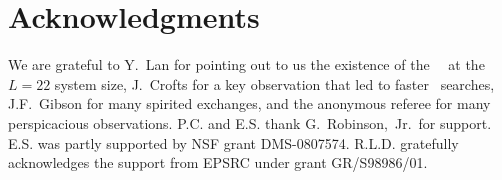 
\section*{Acknowledgments}

We are grateful to Y.~Lan for pointing out to us the existence of
the  ~\eqv\ at the $L=22$ system size, J.~Crofts for a key
observation  that led to faster \rpo\ searches,
J.F.~Gibson for many spirited exchanges, and the anonymous referee
for many perspicacious observations.
P.C. and E.S. thank
G.~Robinson,~Jr.\ for support.
E.S. was partly supported by NSF grant DMS-0807574.
R.L.D. gratefully acknowledges the support from EPSRC under grant GR/S98986/01.
